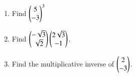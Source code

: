 \renewcommand{\theequation}{\theenumi}
\begin{enumerate}[label=\arabic*.,ref=\thesubsection.\theenumi]
\item Find $\begin{pmatrix}5\\-3\end{pmatrix}^3$
\\
\solution 

\item Find $\begin{pmatrix}-\sqrt{3}\\ \sqrt{2}\end{pmatrix} \begin{pmatrix}2\sqrt{3} \\ -1\end{pmatrix}$.
\\
\solution 
\item Find the multiplicative inverse of $\begin{pmatrix}2\\-3\end{pmatrix}$.
\\
\solution



\end{enumerate}

